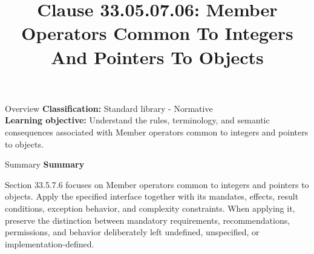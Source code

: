 \documentclass[10pt,letterpaper]{article}
\title{Clause 33.05.07.06: Member Operators Common To Integers And Pointers To Objects}
\author{}
\date{}
\begin{document}
\maketitle
\begin{CornellOverviewBox}{Overview}
\textbf{Classification:} Standard library - Normative\\[2pt]
\textbf{Learning objective:} Understand the rules, terminology, and semantic consequences associated with Member operators common to integers and pointers to objects.
\end{CornellOverviewBox}\begin{CornellSummaryBox}{Summary}
{\sffamily\bfseries\color{Accent} Summary}\par\vspace{3pt}Section 33.5.7.6 focuses on Member operators common to integers and pointers to objects. Apply the specified interface together with its mandates, effects, result conditions, exception behavior, and complexity constraints. When applying it, preserve the distinction between mandatory requirements, recommendations, permissions, and behavior deliberately left undefined, unspecified, or implementation-defined.
\end{CornellSummaryBox}
\end{document}
